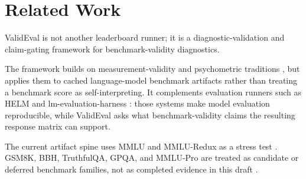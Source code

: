 \section{Related Work}

ValidEval is not another leaderboard runner; it is a diagnostic-validation and claim-gating
framework for benchmark-validity diagnostics.

The framework builds on measurement-validity and psychometric traditions
\citep{messick1995validity,aera2014standards}, but applies them to cached language-model
benchmark artifacts rather than treating a benchmark score as self-interpreting. It complements
evaluation runners such as HELM and lm-evaluation-harness
\citep{liang2022helm,gao2023lmevalharness}: those systems make model evaluation reproducible,
while ValidEval asks what benchmark-validity claims the resulting response matrix can support.

The current artifact spine uses MMLU and MMLU-Redux as a stress test
\citep{hendrycks2021mmlu,gema2024mmlu}. GSM8K, BBH, TruthfulQA, GPQA, and MMLU-Pro are treated
as candidate or deferred benchmark families, not as completed evidence in this draft
\citep{cobbe2021gsm8k,suzgun2022bbh,lin2022truthfulqa,rein2023gpqa,wang2024mmlupro}.
